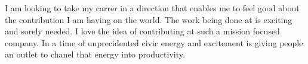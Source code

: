 %
%
%


\par{
	I am looking to take my carrer in a direction that enables me to feel good about the contribution I am having on the world. The work being done at {\companyname} is exciting and sorely needed. I love the idea of contributing at such a mission focused company. In a time of unprecidented civic energy and excitement {\companyname} is giving people an outlet to chanel that energy into productivity.
}
\\